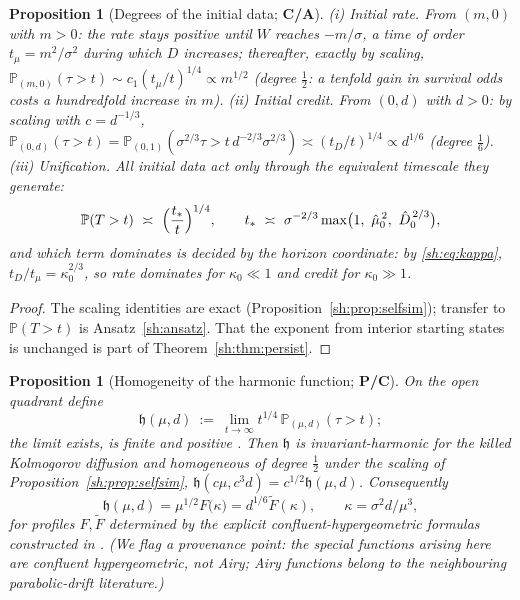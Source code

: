 \documentclass[11pt]{article}
\numberwithin{equation}{section}
\theoremstyle{plain}
\newtheorem{proposition}[theorem]{Proposition}
\theoremstyle{definition}
\theoremstyle{remark}
\newcommand{\PP}{\mathbb{P}}
\newcommand{\hm}{\mathfrak{h}}
\begin{document}
\begin{proposition}[Degrees of the initial data; \textbf{C/A}]
\label{sh:prop:degrees}
\emph{(i) Initial rate.} From $(m,0)$ with $m>0$: the rate stays positive
until $W$ reaches $-m/\sigma$, a time of order $t_\mu=m^2/\sigma^2$ during
which $D$ increases; thereafter, exactly by scaling,
$\PP_{(m,0)}(\tau>t)\sim c_1(t_\mu/t)^{1/4}\propto m^{1/2}$
\emph{(degree $\tfrac12$: a tenfold gain in survival odds costs a
hundredfold increase in $m$)}.
\emph{(ii) Initial credit.} From $(0,d)$ with $d>0$: by scaling with
$c=d^{-1/3}$, $\PP_{(0,d)}(\tau>t)=\PP_{(0,1)}(\sigma^{2/3}\tau>
t\,d^{-2/3}\sigma^{2/3})\asymp(t_D/t)^{1/4}\propto d^{1/6}$
\emph{(degree $\tfrac16$)}.
\emph{(iii) Unification.} All initial data act only through the equivalent
timescale they generate:
\begin{equation}\label{sh:eq:tstar}
\PP(T>t)\ \asymp\ \Bigl(\frac{t_*}{t}\Bigr)^{1/4},\qquad
t_*\ \asymp\ \sigma^{-2/3}\max\bigl(1,\ \hat\mu_0^{\,2},\ \hat
D_0^{\,2/3}\bigr),
\end{equation}
and which term dominates is decided by the horizon coordinate: by
\eqref{sh:eq:kappa}, $t_D/t_\mu=\kappa_0^{2/3}$, so rate dominates for
$\kappa_0\ll1$ and credit for $\kappa_0\gg1$.
\end{proposition}

\begin{proof}
The scaling identities are exact (Proposition~\ref{sh:prop:selfsim});
transfer to $\PP(T>t)$ is Ansatz~\ref{sh:ansatz}. That the exponent from
interior starting states is unchanged is part of
Theorem~\ref{sh:thm:persist}.
\end{proof}

\begin{proposition}[Homogeneity of the harmonic function; \textbf{P/C}]
\label{sh:prop:harmonic}
On the open quadrant define
\[
\hm(\mu,d)\ :=\ \lim_{t\to\infty}t^{1/4}\,\PP_{(\mu,d)}(\tau>t);
\]
the limit exists, is finite and positive \cite{IW94,GJW99}. Then $\hm$ is
invariant-harmonic for the killed Kolmogorov diffusion and homogeneous of
degree $\tfrac12$ under the scaling of
Proposition~\ref{sh:prop:selfsim}, $\hm(c\mu,c^3d)=c^{1/2}\hm(\mu,d)$.
Consequently
\begin{equation}\label{sh:eq:harm}
\hm(\mu,d)=\mu^{1/2}F\bigl(\kappa\bigr)=d^{1/6}\tilde F(\kappa),
\qquad \kappa=\sigma^2d/\mu^3,
\end{equation}
for profiles $F,\tilde F$ determined by the explicit
confluent-hypergeometric formulas constructed in \cite{GJW99}. (We flag
a provenance point: the special functions arising here are confluent
hypergeometric, not Airy; Airy functions belong to the neighbouring
parabolic-drift literature.)
\end{proposition}
\end{document}
